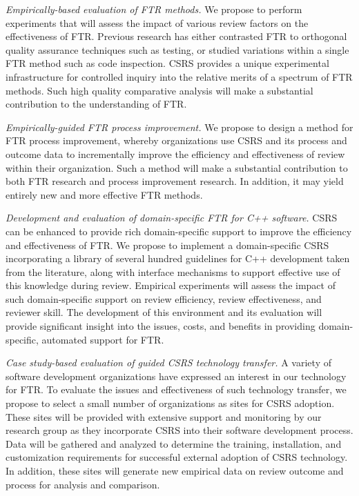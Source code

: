 \begin{itemizenoindent}
  
\item {\em Empirically-based evaluation of FTR methods.} We propose to
  perform experiments that will assess the impact of various review factors
  on the effectiveness of FTR.  Previous research has either contrasted FTR
  to orthogonal quality assurance techniques such as testing, or studied
  variations within a single FTR method such as code inspection.  CSRS
  provides a unique experimental infrastructure for controlled inquiry into
  the relative merits of a spectrum of FTR methods.  Such high quality
  comparative analysis will make a substantial contribution to the
  understanding of FTR.
  
\item {\em Empirically-guided FTR process improvement.} We propose to
  design a method for FTR process improvement, whereby organizations use
  CSRS and its process and outcome data to incrementally improve the
  efficiency and effectiveness of review within their organization.  Such a
  method will make a substantial contribution to both FTR research and
  process improvement research.  In addition, it may yield entirely new and
  more effective FTR methods.
  
\item {\em Development and evaluation of domain-specific FTR for C++
  software. } CSRS can be enhanced to provide rich domain-specific support
  to improve the efficiency and effectiveness of FTR.  We propose to
  implement a domain-specific CSRS incorporating a library of several
  hundred guidelines for C++ development taken from the literature, along
  with interface mechanisms to support effective use of this knowledge
  during review.  Empirical experiments will assess the impact of such
  domain-specific support on review efficiency, review effectiveness, and
  reviewer skill.  The development of this environment and its evaluation
  will provide significant insight into the issues, costs, and benefits in
  providing domain-specific, automated support for FTR.
  
\item {\em Case study-based evaluation of guided CSRS technology
  transfer.} A variety of software development organizations have expressed
  an interest in our technology for FTR.  To evaluate the issues and
  effectiveness of such technology transfer, we propose to select a small
  number of organizations as sites for CSRS adoption.  These sites will be
  provided with extensive support and monitoring by our research group as
  they incorporate CSRS into their software development process.  Data will
  be gathered and analyzed to determine the training, installation, and
  customization requirements for successful external adoption of CSRS
  technology.  In addition, these sites will generate new empirical data on
  review outcome and process for analysis and comparison.
  

\end{itemizenoindent}
